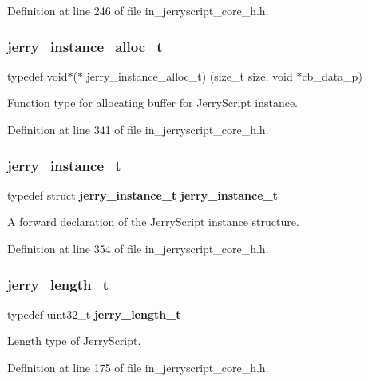 Definition at line 246 of file in\+\_\+jerryscript\+\_\+core\+\_\+h.\+h.

\mbox{\label{group___core_gad01ddb02b1013dd25688ecf5940a2588}} 
\subsubsection{jerry\_instance\_alloc\_t}
{\footnotesize\ttfamily typedef void$\ast$($\ast$ jerry\+\_\+instance\+\_\+alloc\+\_\+t) (size\+\_\+t size, void $\ast$cb\+\_\+data\+\_\+p)}

Function type for allocating buffer for Jerry\+Script instance. 

Definition at line 341 of file in\+\_\+jerryscript\+\_\+core\+\_\+h.\+h.

\mbox{\label{group___core_ga1b61f4e7f04936b5551dd5eca5659df0}} 
\subsubsection{jerry\_instance\_t}
{\footnotesize\ttfamily typedef struct \textbf{ jerry\+\_\+instance\+\_\+t} \textbf{ jerry\+\_\+instance\+\_\+t}}

A forward declaration of the Jerry\+Script instance structure. 

Definition at line 354 of file in\+\_\+jerryscript\+\_\+core\+\_\+h.\+h.

\mbox{\label{group___core_ga3100e7474f3caf3e8a23d2fbf8ca43b5}} 
\subsubsection{jerry\_length\_t}
{\footnotesize\ttfamily typedef uint32\+\_\+t \textbf{ jerry\+\_\+length\+\_\+t}}

Length type of Jerry\+Script. 

Definition at line 175 of file in\+\_\+jerryscript\+\_\+core\+\_\+h.\+h.

\mbox{\label{group___core_ga776566b70a5c7527519b977ab4ac67db}} 
